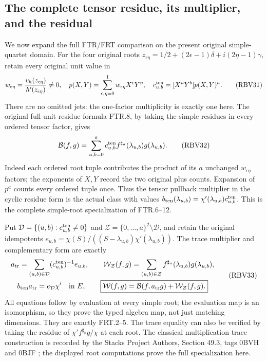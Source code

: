 \subsection{The complete tensor residue, its multiplier, and the residual}
We now expand the full FTR/FRT comparison on the present original
simple-quartet domain. For the four original roots
$z_{\epsilon\eta}=1/2+(2\epsilon-1)\delta+i(2\eta-1)\gamma$,
retain every original unit value in
\[
w_{\epsilon\eta}=\frac{v_h(z_{\epsilon\eta})}{h'(z_{\epsilon\eta})}\ne0,
\quad p(X,Y)=\sum_{\epsilon,\eta=0}^1w_{\epsilon\eta}X^\epsilon Y^\eta,
\quad c_{u,b}^{\rm ten}=[X^uY^b]p(X,Y)^a.
\tag{RBV31}
\]
There are no omitted jets: the one-factor multiplicity is exactly
one here. The original full-unit residue formula FTR.8, by taking
the simple residues in every ordered tensor factor, gives
\[
\mathcal B(f,g)=\sum_{u,b=0}^a
c_{u,b}^{\rm ten} f^{\sharp_a}(\lambda_{u,b})g(\lambda_{u,b}).
\tag{RBV32}
\]
Indeed each ordered root tuple contributes the product of its
$a$ unchanged $w_{\epsilon\eta}$ factors; the exponents of $X,Y$
record the two original plus counts. Expansion of $p^a$ counts
every ordered tuple once. Thus the tensor pullback multiplier in
the cyclic residue form is the actual class with values
$b_{\rm ten}(\lambda_{u,b})=\chi'(\lambda_{u,b})c_{u,b}^{\rm ten}$.
This is the complete simple-root specialization of FTR.6--12.

Put $\mathcal D=\{(u,b):c_{u,b}^{\rm ten}\ne0\}$ and
$\mathcal Z=\{0,\ldots,a\}^2\setminus\mathcal D$, and retain the
original idempotents
$e_{u,b}=\chi(S)/((S-\lambda_{u,b})\chi'(\lambda_{u,b}))$.
The trace multiplier and complementary form are exactly
\[
\begin{gathered}
a_{\rm tr}=\sum_{(u,b)\in\mathcal D}
              (c_{u,b}^{\rm ten})^{-1}e_{u,b},\qquad
\mathcal W_{\mathcal Z}(f,g)=\sum_{(u,b)\in\mathcal Z}
              f^{\sharp_a}(\lambda_{u,b})g(\lambda_{u,b}),\\
b_{\rm ten}a_{\rm tr}=e_{\mathcal D}\chi'\quad\text{in }E,
\qquad
\boxed{\mathcal W(f,g)=\mathcal B(f,a_{\rm tr}g)
                              +\mathcal W_{\mathcal Z}(f,g).}
\end{gathered}\tag{RBV33}
\]
All equations follow by evaluation at every simple root; the
evaluation map is an isomorphism, so they prove the typed algebra
map, not just matching dimensions. They are exactly FRT.2--5.
The trace equality can also be verified by taking the residue of
$\chi'f^{\sharp_a}g/\chi$ at each root. The classical multiplication
trace construction is recorded by the Stacks Project Authors,
Section 49.3, tags 0BVH and 0BJF \cite{human:stacks-trace}; the
displayed root computations prove the full specialization here.

